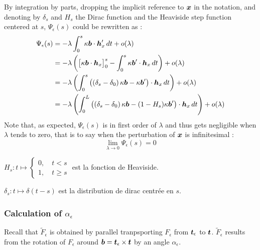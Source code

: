 By integration by parts, dropping the implicit reference to $\boldsymbol{x}$ in the notation, and denoting by $\delta_s$ and $H_s$ the Dirac function and the Heaviside step function centered at $s$, $\Psi_\epsilon(s)$ could be rewritten as :
\begin{equation}
	\begin{aligned}
		\Psi_\epsilon(s) 
		&= - \lambda \int_0^s \kappa\boldsymbol{b}\cdot\boldsymbol{h}'_x \,dt + o(\lambda)\\
		&=  - \lambda \left(\big[\kappa\boldsymbol{b} \cdot  \boldsymbol{h}_x \big]_0^s - \int_0^s \kappa\boldsymbol{b}' \cdot  \boldsymbol{h}_x \,dt\right) + o(\lambda)\\
		&= - \lambda \left(\int_0^s \left(\left(\delta_s-\delta_0\right)\kappa\boldsymbol{b} - \kappa\boldsymbol{b}'\right)\cdot  \boldsymbol{h}_x \,dt\right) + o(\lambda)\\
		&= - \lambda \left(\int_0^L \left(\left(\delta_s-\delta_0\right)\kappa\boldsymbol{b} - (1-H_s)\kappa\boldsymbol{b}'\right)\cdot  \boldsymbol{h}_x \,dt\right) + o(\lambda)
	\end{aligned}
\end{equation}
Note that, as expected, $\Psi_\epsilon(s)$ is in first order of $\lambda$ and thus gets negligible when $\lambda$ tends to zero, that is to say when the perturbation of $\boldsymbol{x}$ is infinitesimal :
\begin{equation}
	\lim_{\lambda \to 0} \Psi_\epsilon(s) = 0
\end{equation}

$H_s : t \mapsto \left\{\begin{array}{c}0  , \quad t<s \\1  , \quad t\geqslant s \end{array}\right.$ est la fonction de Heaviside.

$\delta_s : t \mapsto \delta(t-s)$ est la distribution de dirac centrée en $s$.

\subsubsection{Calculation of $\alpha_\epsilon$}

Recall that $\tilde{F}_\epsilon$ is obtained by parallel tranpsporting $F_\epsilon$ from $\boldsymbol{t}_\epsilon$ to $\boldsymbol{t}$.
$\tilde{F}_\epsilon$ results from the rotation of $F_\epsilon$ around $\boldsymbol{b} = \boldsymbol{t}_\epsilon \times \boldsymbol{t}$ by an angle $\alpha_\epsilon$.

